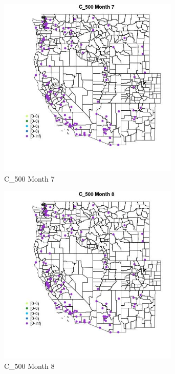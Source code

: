 \begin{figure} 
\centering  
\includegraphics[width=0.77\textwidth]{Code_Outputs/Report_ML_input_PM25_Step4_part_e_de_duplicated_aves_MapObsMo7C_500.jpg} 
\caption{\label{fig:Report_ML_input_PM25_Step4_part_e_de_duplicated_avesMapObsMo7C_500}C_500 Month 7} 
\end{figure} 
 

\begin{figure} 
\centering  
\includegraphics[width=0.77\textwidth]{Code_Outputs/Report_ML_input_PM25_Step4_part_e_de_duplicated_aves_MapObsMo8C_500.jpg} 
\caption{\label{fig:Report_ML_input_PM25_Step4_part_e_de_duplicated_avesMapObsMo8C_500}C_500 Month 8} 
\end{figure} 
 

